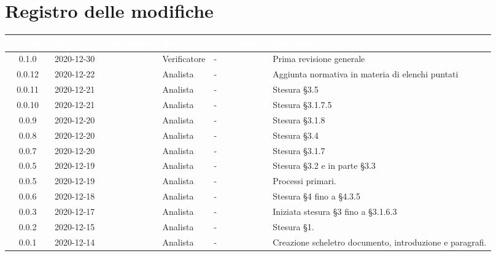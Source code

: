 \section*{Registro delle modifiche}
\setcounter{table}{-1}
{

\renewcommand{\arraystretch}{1.5}
\centering
\begin{longtable}{c C{2.6cm} C{2.6cm} C{2.6cm} C{2.6cm} C{3.5cm}}
\textcolor{white}{\textbf{Versione}}&
\textcolor{white}{\textbf{Data}}&
\textcolor{white}{\textbf{Nominativo}}&
\textcolor{white}{\textbf{Ruolo}}&
\textcolor{white}{\textbf{Verificatore}}&
\textcolor{white}{\textbf{Descrizione}}\\	
\endhead

0.1.0 & 2020-12-30 & \SP{} & Verificatore & - & Prima revisione generale\\
0.0.12 & 2020-12-22 & \PA{} & Analista & - & Aggiunta normativa in materia di elenchi puntati \\
0.0.11 & 2020-12-21 & \RA{} & Analista & - & Stesura \S 3.5 \\
0.0.10 & 2020-12-21 & \PA{} & Analista & - & Stesura \S 3.1.7.5 \\
0.0.9 & 2020-12-20 & \PA{} & Analista & - & Stesura \S 3.1.8 \\
0.0.8 & 2020-12-20 & \RA{} & Analista & - & Stesura \S 3.4 \\
0.0.7 & 2020-12-20 & \PA{} & Analista & - & Stesura \S 3.1.7 \\
0.0.5 & 2020-12-19 & \RA{} & Analista & - & Stesura \S 3.2 e in parte \S 3.3 \\
0.0.5 & 2020-12-19 & \ZM{} & Analista & - & Processi primari. \\
0.0.6 & 2020-12-18 & \SH{} & Analista & - & Stesura \S 4 fino a \S 4.3.5\\
0.0.3 & 2020-12-17 & \PA{} & Analista & - & Iniziata stesura \S 3 fino a \S 3.1.6.3 \\
0.0.2 & 2020-12-15 & \PA{} & Analista & - & Stesura \S 1. \\
0.0.1 & 2020-12-14 & \ZM{} & Analista & - & Creazione scheletro documento, introduzione e paragrafi. \\
		
\end{longtable}
}
